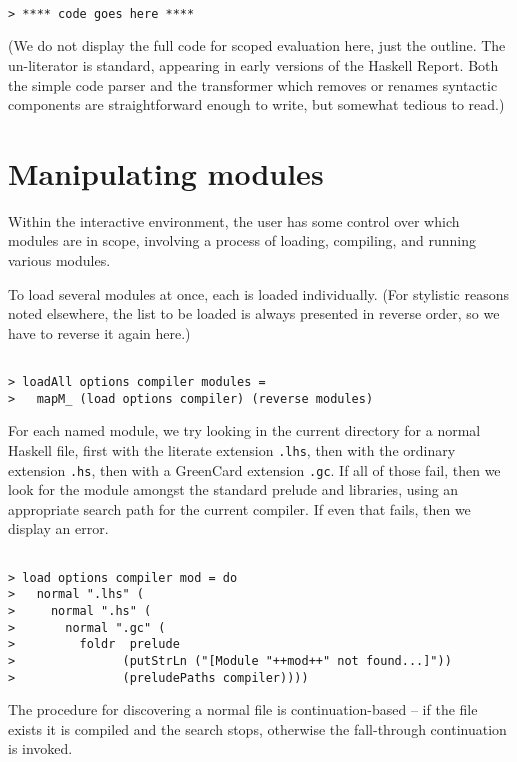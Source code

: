 \documentclass[a4paper]{article}
\begin{document}
\begin{verbatim}

> **** code goes here ****

\end{verbatim}

(We do not display the full code for scoped evaluation here, just the
outline.  The un-literator is standard, appearing in early versions of
the Haskell Report.  Both the simple code parser and the transformer
which removes or renames syntactic components are straightforward
enough to write, but somewhat tedious to read.)


\section{Manipulating modules}

Within the interactive environment, the user has some control over
which modules are in scope, involving a process of loading, compiling,
and running various modules.

To load several modules at once, each is loaded individually.
(For stylistic reasons noted elsewhere, the list to be loaded is always
presented in reverse order, so we have to reverse it again here.)

\begin{verbatim}

> loadAll options compiler modules =
>   mapM_ (load options compiler) (reverse modules)

\end{verbatim}

For each named module, we try looking in the current directory for a
normal Haskell file, first with the literate extension {\tt .lhs},
then with the ordinary extension {\tt .hs}, then with a GreenCard
extension {\tt .gc}.  If all of those fail, then we look for the module
amongst the standard prelude and libraries, using an appropriate
search path for the current compiler.  If even that fails, then we
display an error.

\begin{verbatim}

> load options compiler mod = do
>   normal ".lhs" (
>     normal ".hs" (
>       normal ".gc" (
>         foldr  prelude
>               (putStrLn ("[Module "++mod++" not found...]"))
>               (preludePaths compiler))))

\end{verbatim}

The procedure for discovering a normal file is continuation-based
-- if the file exists it is compiled and the search stops, otherwise
the fall-through continuation is invoked.
\end{document}
